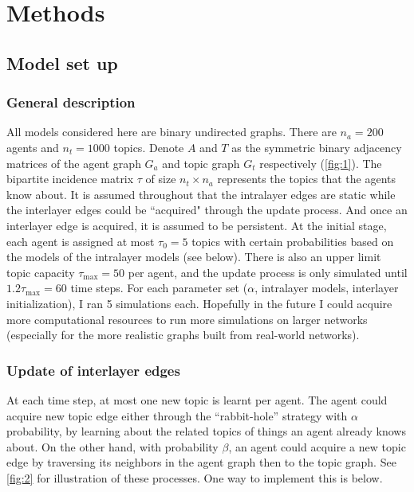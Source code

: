 \section{Methods}

\subsection{Model set up}


\subsubsection*{General description}



All models considered here are binary undirected graphs. There are $n_a = 200$ agents and $n_t = 1000$ topics. Denote $A$ and $T$ as the symmetric binary adjacency matrices of the agent graph $G_a$ and topic graph $G_t$ respectively (\ref{fig:1}). The bipartite incidence matrix $\tau$ of size $n_t \times n_a$ represents the topics that the agents know about. It is assumed throughout that the intralayer edges are static while the interlayer edges could be ``acquired" through the update process. And once an interlayer edge is acquired, it is assumed to be persistent. At the initial stage, each agent is assigned at most $\tau_0 = 5$ topics with certain probabilities based on the models of the intralayer models (see below). There is also an upper limit topic capacity $\tau_{\mathrm{max}} = 50$ per agent, and the update process is only simulated until $1.2 \tau_{\mathrm{max}} = 60$ time steps. For each parameter set ($\alpha$, intralayer models, interlayer initialization), I ran 5 simulations each. Hopefully in the future I could acquire more computational resources to run more simulations on larger networks (especially for the more realistic graphs built from real-world networks).

\subsubsection*{Update of interlayer edges}

At each time step, at most one new topic is learnt per agent. The agent could acquire new topic edge either through the ``rabbit-hole'' strategy with $\alpha$ probability, by learning about the related topics of things an agent already knows about. On the other hand, with probability $\beta$, an agent could acquire a new topic edge by traversing its neighbors in the agent graph then to the topic graph. See \ref{fig:2} for illustration of these processes. One way to implement this is below.

